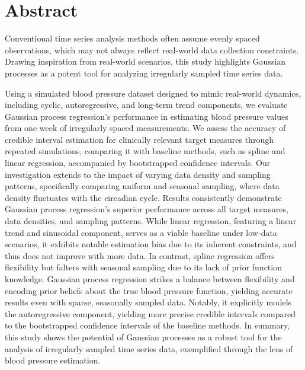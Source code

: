 \chapter*{Abstract}
Conventional time series analysis methods often assume evenly spaced observations,
which may not always reflect real-world data collection constraints.
Drawing inspiration from real-world scenarios, this study highlights Gaussian
processes as a potent tool for analyzing irregularly sampled
time series data.

Using a simulated blood pressure dataset designed to mimic real-world dynamics,
including cyclic, autoregressive, and long-term trend components,
we evaluate Gaussian process regression's performance in estimating
blood pressure values from one week of irregularly spaced measurements.
We assess the accuracy of credible interval estimation for clinically relevant
target measures through repeated simulations, comparing it with baseline methods,
such as spline and linear regression, accompanied by bootstrapped confidence intervals.
Our investigation extends to the impact of varying data density and sampling patterns,
specifically comparing uniform and seasonal sampling, where data density fluctuates with the circadian cycle.
Results consistently demonstrate Gaussian process regression's superior
performance across all target measures,
data densities, and sampling patterns.
While linear regression, featuring a linear trend and sinusoidal component,
serves as a viable baseline under low-data scenarios, it exhibits notable
estimation bias due to its inherent constraints, and thus does not improve with more data.
In contrast, spline regression offers flexibility but falters with seasonal
sampling due to its lack of prior function knowledge.
Gaussian process regression strikes a balance between flexibility and encoding
prior beliefs about the true blood pressure function, yielding accurate results
even with sparse, seasonally sampled data.
Notably, it explicitly models the autoregressive component,
yielding more precise credible intervals compared to the bootstrapped
confidence intervals of the baseline methods.
In summary, this study shows the potential of Gaussian processes as a
robust tool for the analysis of irregularly sampled time series data,
exemplified through the lens of blood pressure estimation.

